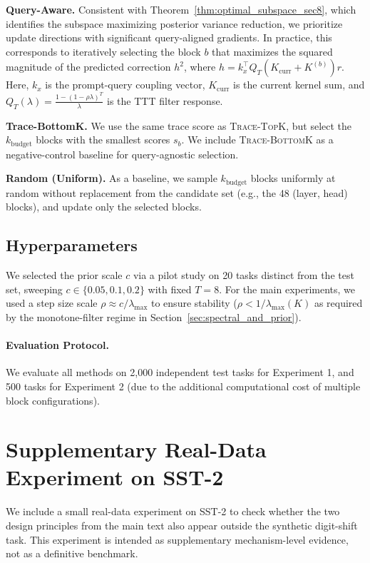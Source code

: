 \documentclass{article}
\theoremstyle{plain}
\theoremstyle{definition}
\theoremstyle{remark}
\begin{document}
\textbf{Query-Aware.} 
Consistent with Theorem~\ref{thm:optimal_subspace_sec8}, which identifies the subspace maximizing posterior variance reduction, we prioritize update directions with significant query-aligned gradients. In practice, this corresponds to iteratively selecting the block $b$ that maximizes the squared magnitude of the predicted correction $h^2$, where $h = k_x^\top Q_T(K_{\text{curr}} + K^{(b)}) r$. Here, $k_x$ is the prompt-query coupling vector, $K_{\text{curr}}$ is the current kernel sum, and $Q_T(\lambda) = \frac{1 - (1-\rho\lambda)^T}{\lambda}$ is the TTT filter response.

\textbf{Trace-BottomK.}
We use the same trace score as \textsc{Trace-TopK}, but select the $k_{\text{budget}}$ blocks with the smallest scores $s_b$. We include \textsc{Trace-BottomK} as a negative-control baseline for query-agnostic selection. 

\textbf{Random (Uniform).}
As a baseline, we sample $k_{\text{budget}}$ blocks uniformly at random without replacement from the candidate set (e.g., the 48 (layer, head) blocks), and update only the selected blocks. 


\subsection{Hyperparameters}
We selected the prior scale $c$ via a pilot study on 20 tasks distinct from the test set, sweeping $c \in \{0.05, 0.1, 0.2\}$ with fixed $T=8$. For the main experiments, we used a step size scale $\rho \approx c / \lambda_{\max}$ to ensure stability ($\rho < 1/\lambda_{\max}(K)$ as required by the monotone-filter regime in Section~\ref{sec:spectral_and_prior}).

\paragraph{Evaluation Protocol.} We evaluate all methods on 2{,}000 independent test tasks for Experiment 1, and 500 tasks for Experiment 2 (due to the additional computational cost of multiple block configurations). 


\section{Supplementary Real-Data Experiment on SST-2}
\label{app:sst2_realdata}

We include a small real-data experiment on SST-2 to check whether the two design principles from the main text also appear outside the synthetic digit-shift task. This experiment is intended as supplementary mechanism-level evidence, not as a definitive benchmark.
\end{document}
